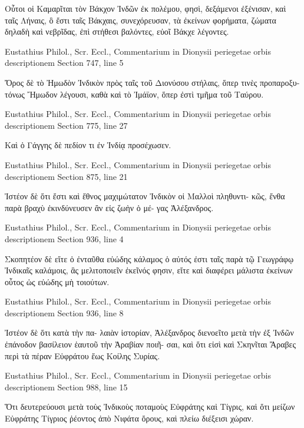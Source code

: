 \documentclass[12pt,letterpaper,twoside,final]{memoir}
\begin{document}
\begin{greek}
                          Οὗτοι οἱ Καμαρῖται τὸν Βάκχον 
Ἰνδῶν ἐκ πολέμου, φησὶ, δεξάμενοι ἐξένισαν, καὶ ταῖς 
Λήναις, ὃ ἔστι ταῖς Βάκχαις, συνεχόρευσαν, τὰ ἐκείνων 
φορήματα, ζώματα δηλαδὴ καὶ νεβρῖδας, ἐπὶ στήθεσι 
βαλόντες, εὐοῖ Βάκχε λέγοντες. 



Eustathius Philol., Scr. Eccl., Commentarium in Dionysii periegetae orbis descriptionem 
Section 747, line 5

            Ὄρος δὲ τὸ Ἠμωδὸν Ἰνδικὸν πρὸς ταῖς 
τοῦ Διονύσου στήλαις, ὅπερ τινὲς προπαροξυτόνως 
Ἤμωδον λέγουσι, καθὰ καὶ τὸ Ἰμάϊον, ὅπερ ἐστὶ 
τμῆμα τοῦ Ταύρου. 



Eustathius Philol., Scr. Eccl., Commentarium in Dionysii periegetae orbis descriptionem 
Section 775, line 27

                                         Καὶ ὁ Γάγγης 
δὲ πεδίον τι ἐν Ἰνδίᾳ προσέχωσεν. 



Eustathius Philol., Scr. Eccl., Commentarium in Dionysii periegetae orbis descriptionem 
Section 875, line 21

                                   Ἰστέον δὲ ὅτι ἔστι 
καὶ ἔθνος μαχιμώτατον Ἰνδικὸν οἱ Μαλλοὶ πληθυντι-
κῶς, ἔνθα παρὰ βραχὺ ἐκινδύνευσεν ἂν εἰς ζωὴν ὁ μέ-
γας Ἀλέξανδρος. 



Eustathius Philol., Scr. Eccl., Commentarium in Dionysii periegetae orbis descriptionem 
Section 936, line 4

                                            Σκοπητέον δὲ 
εἴτε ὁ ἐνταῦθα εὐώδης κάλαμος ὁ αὐτός ἐστι ταῖς παρὰ 
τῷ Γεωγράφῳ Ἰνδικαῖς καλάμοις, ἃς μελιτοποιεῖν 
ἐκεῖνός φησιν, εἴτε καὶ διαφέρει μάλιστα ἐκείνων οὗτος 
ὡς εὐώδης μὴ τοιούτων. 



Eustathius Philol., Scr. Eccl., Commentarium in Dionysii periegetae orbis descriptionem 
Section 936, line 8

                            Ἰστέον δὲ ὅτι κατὰ τὴν πα-
λαιὰν ἱστορίαν, Ἀλέξανδρος διενοεῖτο μετὰ τὴν ἐξ 
Ἰνδῶν ἐπάνοδον βασίλειον ἑαυτοῦ τὴν Ἀραβίαν ποιῆ-
σαι, καὶ ὅτι εἰσὶ καὶ Σκηνῖται Ἄραβες περὶ τὰ πέραν 
Εὐφράτου ἕως Κοίλης Συρίας. 



Eustathius Philol., Scr. Eccl., Commentarium in Dionysii periegetae orbis descriptionem 
Section 988, line 15

Ὅτι δευτερεύουσι μετὰ τοὺς Ἰνδικοὺς ποταμοὺς 
Εὐφράτης καὶ Τίγρις, καὶ ὅτι μείζων Εὐφράτης Τίγριος 
ῥέοντος ἀπὸ Νιφάτα ὄρους, καὶ πλείω διέξεισι χώραν. 




\end{greek}
\end{document}
